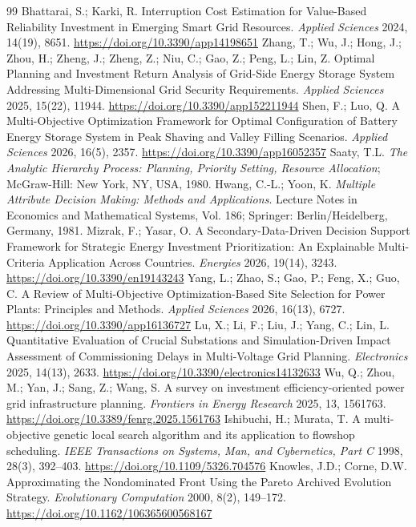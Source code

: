 \documentclass[applsci,article,submit,moreauthors]{Definitions/mdpi}
\begin{document}
\begin{thebibliography}{99}
 Bhattarai, S.; Karki, R. Interruption Cost Estimation for Value-Based Reliability Investment in Emerging Smart Grid Resources. \emph{Applied Sciences} 2024, 14(19), 8651. \url{https://doi.org/10.3390/app14198651}
 Zhang, T.; Wu, J.; Hong, J.; Zhou, H.; Zheng, J.; Zheng, Z.; Niu, C.; Gao, Z.; Peng, L.; Lin, Z. Optimal Planning and Investment Return Analysis of Grid-Side Energy Storage System Addressing Multi-Dimensional Grid Security Requirements. \emph{Applied Sciences} 2025, 15(22), 11944. \url{https://doi.org/10.3390/app152211944}
 Shen, F.; Luo, Q. A Multi-Objective Optimization Framework for Optimal Configuration of Battery Energy Storage System in Peak Shaving and Valley Filling Scenarios. \emph{Applied Sciences} 2026, 16(5), 2357. \url{https://doi.org/10.3390/app16052357}
 Saaty, T.L. \emph{The Analytic Hierarchy Process: Planning, Priority Setting, Resource Allocation}; McGraw-Hill: New York, NY, USA, 1980.
 Hwang, C.-L.; Yoon, K. \emph{Multiple Attribute Decision Making: Methods and Applications}. Lecture Notes in Economics and Mathematical Systems, Vol. 186; Springer: Berlin/Heidelberg, Germany, 1981.
 Mizrak, F.; Yasar, O. A Secondary-Data-Driven Decision Support Framework for Strategic Energy Investment Prioritization: An Explainable Multi-Criteria Application Across Countries. \emph{Energies} 2026, 19(14), 3243. \url{https://doi.org/10.3390/en19143243}
 Yang, L.; Zhao, S.; Gao, P.; Feng, X.; Guo, C. A Review of Multi-Objective Optimization-Based Site Selection for Power Plants: Principles and Methods. \emph{Applied Sciences} 2026, 16(13), 6727. \url{https://doi.org/10.3390/app16136727}
 Lu, X.; Li, F.; Liu, J.; Yang, C.; Lin, L. Quantitative Evaluation of Crucial Substations and Simulation-Driven Impact Assessment of Commissioning Delays in Multi-Voltage Grid Planning. \emph{Electronics} 2025, 14(13), 2633. \url{https://doi.org/10.3390/electronics14132633}
 Wu, Q.; Zhou, M.; Yan, J.; Sang, Z.; Wang, S. A survey on investment efficiency-oriented power grid infrastructure planning. \emph{Frontiers in Energy Research} 2025, 13, 1561763. \url{https://doi.org/10.3389/fenrg.2025.1561763}
 Ishibuchi, H.; Murata, T. A multi-objective genetic local search algorithm and its application to flowshop scheduling. \emph{IEEE Transactions on Systems, Man, and Cybernetics, Part C} 1998, 28(3), 392--403. \url{https://doi.org/10.1109/5326.704576}
 Knowles, J.D.; Corne, D.W. Approximating the Nondominated Front Using the Pareto Archived Evolution Strategy. \emph{Evolutionary Computation} 2000, 8(2), 149--172. \url{https://doi.org/10.1162/106365600568167}

\end{thebibliography}
\end{document}
